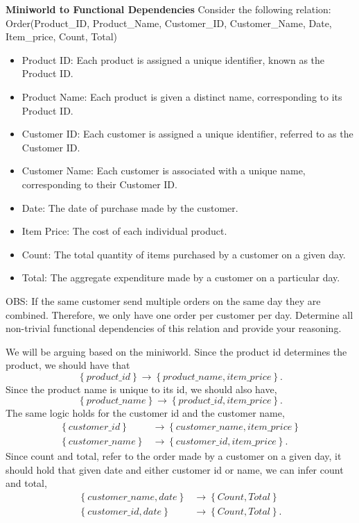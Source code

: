 \documentclass[working, oneside]{../../Preambles/tuftebook}
\begin{document}
\begin{exercise}[3]
    \textbf{Miniworld to Functional Dependencies}
    Consider the following relation:
    Order(Product\_ID, Product\_Name, Customer\_ID, Customer\_Name, Date, Item\_price, Count, Total)
    \begin{itemize}
        \item Product ID: Each product is assigned a unique identifier, known as the Product ID.
        \item Product Name: Each product is given a distinct name, corresponding to its Product ID.
        \item Customer ID: Each customer is assigned a unique identifier, referred to as the Customer ID.
        \item Customer Name: Each customer is associated with a unique name, corresponding to their Customer ID.
        \item Date: The date of purchase made by the customer.
        \item Item Price: The cost of each individual product.
        \item Count: The total quantity of items purchased by a customer on a given day.
        \item Total: The aggregate expenditure made by a customer on a particular day.
    \end{itemize}
    OBS: If the same customer send multiple orders on the same day they are combined. Therefore, we only have one order per customer per day.
    Determine all non-trivial functional dependencies of this relation and provide your reasoning.
\end{exercise}
\begin{solution}
We will be arguing based on the miniworld. Since the product id determines the product, we should have that
\[
\left\{ product\_id \right\} \to \left\{ product\_name, item\_price\right\} 
.\] 
Since the product name is unique to its id, we should also have,
\[
\left\{ product\_name \right\} \to \left\{ product\_id, item\_price\right\} 
.\] 
The same logic holds for the customer id and the customer name,
\begin{align*}
\left\{ customer\_id \right\} &\to \left\{ customer\_name, item\_price\right\} \\
\left\{ customer\_name \right\} &\to \left\{ customer\_id, item\_price\right\} 
.\end{align*}
Since count and total, refer to the order made by a customer on a given day, it should hold that given date and either customer id or name, we can infer count and total,
\begin{align*}
\left\{ customer\_name, date \right\} &\to \left\{ Count, Total\right\} \\
\left\{ customer\_id, date \right\} &\to \left\{ Count, Total\right\} 
.\end{align*}
\end{solution}
\end{document}
